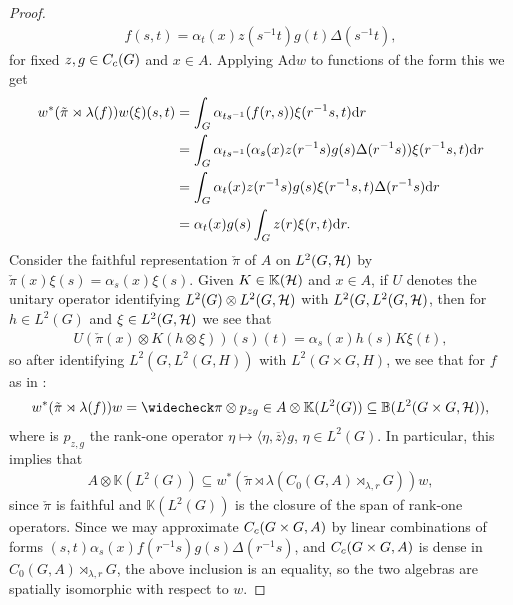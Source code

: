 \begin{proof}
\begin{align}
	f(s,t) = \alpha_{t}(x) z(s^{-1}t)g(t) \Delta(s^{-1}t),
	\label{functionform1}
\end{align}
for fixed $z,g \in C_c(G)$ and $x \in A$. Applying $\mathrm{Ad} {w}$ to functions of the form  this we get
\begin{align*}
	w^* (\tilde \pi \rtimes \lambda(f)) w(\xi)(s,t) &= \int_G \alpha_{ts^{-1}}(f(r,s)) \xi(r^{-1}s,t) \mathrm{d} r\\
	&= \int_G \alpha_{ts^{-1}}(\alpha_s(x) z(r^{-1}s)g(s) \Delta(r^{-1}s)) \xi(r^{-1}s,t) \mathrm{d} r \\
	&= \int_G \alpha_t(x) z(r^{-1}s) g(s) \xi(r^{-1}s,t) \Delta(r^{-1}s)  \mathrm{d} r\\
	&= \alpha_t(x) g(s) \int_G z(r) \xi(r,t) \mathrm{d} r.
\end{align*}
Consider the faithful representation $\check \pi$ of $A$ on $L^2(G,\mathcal{H})$ by $\check \pi(x) \xi(s) = \alpha_s(x) \xi(s)$. Given $K \in \mathbb{K}(\mathcal{H})$ and $x \in A$, if $U$ denotes the unitary operator identifying $L^2(G) \otimes L^2(G,\mathcal{H})$ with $L^2(G, L^2(G, \mathcal{H})$, then for $h \in L^2(G)$ and $\xi \in L^2(G,\mathcal{H})$ we see that
\begin{align*}
	U (\check \pi(x) \otimes K (h \otimes \xi))(s)(t) = \alpha_s(x) h(s) K \xi(t),
\end{align*}
so after identifying $L^2(G,L^2(G,H))$ with $L^2(G \times G,H)$, we see that for $f$ as in :
\begin{align*}
	w^* (\tilde \pi \rtimes \lambda (f)) w  = \check \pi \otimes p_{zg} \in A \otimes \mathbb{K}(L^2(G)) \subseteq \mathbb{B}(L^2(G \times G,\H)),
\end{align*}
where is $p_{z,g}$ the rank-one operator $\eta \mapsto \langle \eta , \overline z \rangle g$, $\eta \in L^2(G)$.
In particular, this implies that 
\begin{align*}
	A \otimes \mathbb{K}(L^2(G)) \subseteq w^* (\tilde \pi \rtimes \lambda (C_0(G,A) \rtimes_{\lambda, r} G))w,
\end{align*}
since $\check \pi$ is faithful and $\mathbb{K}(L^2(G))$ is the closure of the span of rank-one operators. Since we may approximate $C_c(G \times G, A)$ by linear combinations of forms $(s,t)  \alpha_s(x)  f(r^{-1}s)g(s) \Delta(r^{-1}s)$, and $C_c(G \times G, A)$ is dense in $C_0(G,A) \rtimes_{\lambda, r}G$, the above inclusion is an equality, so the two algebras are spatially isomorphic with respect to $w$.


\end{proof}
